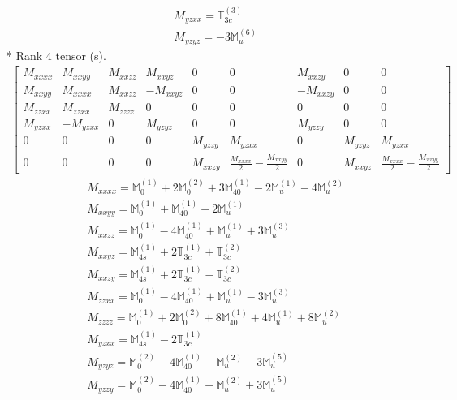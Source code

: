 \documentclass[fleqn,8pt,landscape]{jsarticle}
\begin{document}
\begin{align*}
& M_{yzxx} = \mathbb{T}_{3c}^{(3)} \\
& M_{yzyz} = - 3 \mathbb{M}_{u}^{(6)}
\end{align*}
* Rank 4 tensor (s).
\begin{align*}
\begin{bmatrix} M_{xxxx} & M_{xxyy} & M_{xxzz} & M_{xxyz} & 0 & 0 & M_{xxzy} & 0 & 0 \\ M_{xxyy} & M_{xxxx} & M_{xxzz} & - M_{xxyz} & 0 & 0 & - M_{xxzy} & 0 & 0 \\ M_{zzxx} & M_{zzxx} & M_{zzzz} & 0 & 0 & 0 & 0 & 0 & 0 \\ M_{yzxx} & - M_{yzxx} & 0 & M_{yzyz} & 0 & 0 & M_{yzzy} & 0 & 0 \\ 0 & 0 & 0 & 0 & M_{yzzy} & M_{yzxx} & 0 & M_{yzyz} & M_{yzxx} \\ 0 & 0 & 0 & 0 & M_{xxzy} & \frac{M_{xxxx}}{2} - \frac{M_{xxyy}}{2} & 0 & M_{xxyz} & \frac{M_{xxxx}}{2} - \frac{M_{xxyy}}{2} \end{bmatrix}
\end{align*}
\begin{align*}
& M_{xxxx} = \mathbb{M}_{0}^{(1)} + 2 \mathbb{M}_{0}^{(2)} + 3 \mathbb{M}_{40}^{(1)} - 2 \mathbb{M}_{u}^{(1)} - 4 \mathbb{M}_{u}^{(2)} \\
& M_{xxyy} = \mathbb{M}_{0}^{(1)} + \mathbb{M}_{40}^{(1)} - 2 \mathbb{M}_{u}^{(1)} \\
& M_{xxzz} = \mathbb{M}_{0}^{(1)} - 4 \mathbb{M}_{40}^{(1)} + \mathbb{M}_{u}^{(1)} + 3 \mathbb{M}_{u}^{(3)} \\
& M_{xxyz} = \mathbb{M}_{4s}^{(1)} + 2 \mathbb{T}_{3c}^{(1)} + \mathbb{T}_{3c}^{(2)} \\
& M_{xxzy} = \mathbb{M}_{4s}^{(1)} + 2 \mathbb{T}_{3c}^{(1)} - \mathbb{T}_{3c}^{(2)} \\
& M_{zzxx} = \mathbb{M}_{0}^{(1)} - 4 \mathbb{M}_{40}^{(1)} + \mathbb{M}_{u}^{(1)} - 3 \mathbb{M}_{u}^{(3)} \\
& M_{zzzz} = \mathbb{M}_{0}^{(1)} + 2 \mathbb{M}_{0}^{(2)} + 8 \mathbb{M}_{40}^{(1)} + 4 \mathbb{M}_{u}^{(1)} + 8 \mathbb{M}_{u}^{(2)} \\
& M_{yzxx} = \mathbb{M}_{4s}^{(1)} - 2 \mathbb{T}_{3c}^{(1)} \\
& M_{yzyz} = \mathbb{M}_{0}^{(2)} - 4 \mathbb{M}_{40}^{(1)} + \mathbb{M}_{u}^{(2)} - 3 \mathbb{M}_{u}^{(5)} \\
& M_{yzzy} = \mathbb{M}_{0}^{(2)} - 4 \mathbb{M}_{40}^{(1)} + \mathbb{M}_{u}^{(2)} + 3 \mathbb{M}_{u}^{(5)}
\end{align*}
\end{document}

